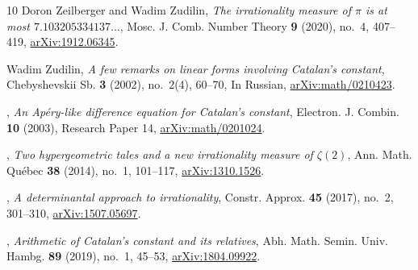 \documentclass[11pt]{amsart}
\theoremstyle{definition}
\theoremstyle{remark}
\numberwithin{equation}{section}
\begin{document}
\begin{thebibliography}{10}
Doron Zeilberger and Wadim Zudilin, \emph{The irrationality measure of {$\pi$}
  is at most {$7.103205334137\ldots$}}, Mosc. J. Comb. Number Theory \textbf{9}
  (2020), no.~4, 407--419,
  \href{https://arxiv.org/abs/1912.06345}{arXiv:1912.06345}.

Wadim Zudilin, \emph{A few remarks on linear forms involving {C}atalan's
  constant}, Chebyshevskii Sb. \textbf{3} (2002), no.~2(4), 60--70, In Russian,
  \href{https://arxiv.org/abs/math/0210423}{arXiv:math/0210423}.

\bysame, \emph{An {A}p\'ery-like difference equation for {C}atalan's constant},
  Electron. J. Combin. \textbf{10} (2003), Research Paper 14,
  \href{https://arxiv.org/abs/math/0201024}{arXiv:math/0201024}.

\bysame, \emph{Two hypergeometric tales and a new irrationality measure of
  {$\zeta(2)$}}, Ann. Math. Qu\'ebec \textbf{38} (2014), no.~1, 101--117,
  \href{https://arxiv.org/abs/1310.1526}{arXiv:1310.1526}.

\bysame, \emph{A determinantal approach to irrationality}, Constr. Approx.
  \textbf{45} (2017), no.~2, 301--310,
  \href{https://arxiv.org/abs/1507.05697}{arXiv:1507.05697}.

\bysame, \emph{Arithmetic of {C}atalan's constant and its relatives}, Abh.
  Math. Semin. Univ. Hambg. \textbf{89} (2019), no.~1, 45--53,
  \href{https://arxiv.org/abs/1804.09922}{arXiv:1804.09922}.

\end{thebibliography}
\end{document}
